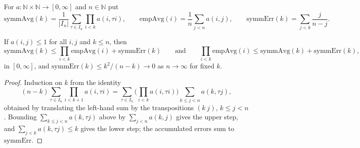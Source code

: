 \begin{definition}
    \label{def:app-symm-avg}
    \leanok

    For $a : \mathbb{N} \times \mathbb{N} \to [0,\infty]$ and $n \in \mathbb{N}$ put
    \[\mathrm{symmAvg}(k) = \frac{1}{|I_n|}\sum_{\tau \in I_n} \prod_{i < k} a(i, \tau i),
      \qquad \mathrm{empAvg}(i) = \frac{1}{n}\sum_{j < n} a(i,j),
      \qquad \mathrm{symmErr}(k) = \sum_{j < k} \frac{j}{n - j}.\]
\end{definition}

\begin{theorem}
    \label{thm:app-symm-estimate}
    \leanok

    If $a(i,j) \le 1$ for all $i,j$ and $k \le n$, then
    \[\mathrm{symmAvg}(k) \le \prod_{i<k}\mathrm{empAvg}(i) + \mathrm{symmErr}(k)
      \qquad\text{and}\qquad
      \prod_{i<k}\mathrm{empAvg}(i) \le \mathrm{symmAvg}(k) + \mathrm{symmErr}(k),\]
    in $[0,\infty]$, and $\mathrm{symmErr}(k) \le k^2/(n-k) \to 0$ as $n \to \infty$ for fixed
    $k$.
\end{theorem}
\begin{proof}
    \leanok

    Induction on $k$ from the identity
    \[(n-k)\sum_{\tau \in I_n}\prod_{i<k+1} a(i,\tau i)
      = \sum_{\tau \in I_n}\Big(\prod_{i<k} a(i,\tau i)\Big)\sum_{k \le j < n} a(k, \tau j),\]
    obtained by translating the left-hand sum by the transpositions $(k\ j)$, $k \le j < n$.
    Bounding $\sum_{k \le j < n} a(k,\tau j)$ above by $\sum_{j<n} a(k,j)$ gives the upper
    step, and $\sum_{j<k} a(k,\tau j) \le k$ gives the lower step; the accumulated errors sum to
    $\mathrm{symmErr}$.
\end{proof}

